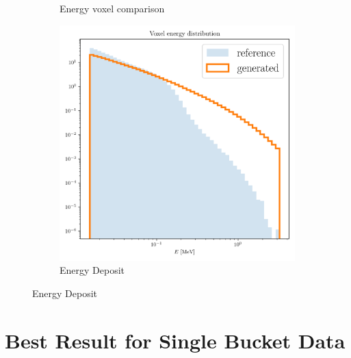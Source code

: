 \begin{figure}[htbp]
\begin{subfigure}[b]{0.3\textwidth}
        \caption{Energy voxel comparison}
        \label{fig:a1_5}
    \end{subfigure}
    \hfill
    \begin{subfigure}[b]{0.3\textwidth}
        \centering
        \includegraphics[width=\textwidth]{Figures/a1_7.png}
        \caption{Energy Deposit}
        \label{fig:a1_7}
    \end{subfigure}
\end{figure}

\newpage
\section{Best Result for Single Bucket Data}



